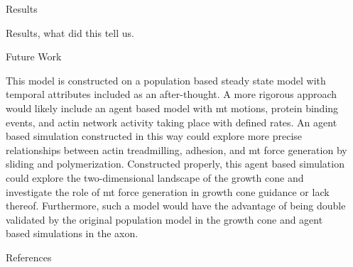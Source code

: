 \documentclass{beamer}
\newlength{\sepwidth}
\newlength{\colwidth}
\newcommand{\separatorcolumn}{\begin{column}{\sepwidth}\end{column}}
\begin{document}
\begin{frame}[t]
\begin{columns}[t]
\begin{column}{\colwidth}
\begin{block}{Results}

Results, what did this tell us.

\end{block}

\begin{block}{Future Work}

This model is constructed on a population based steady state model with temporal attributes included as an after-thought. A more rigorous approach would likely include an agent based model with mt motions, protein binding events, and actin network activity taking place with defined rates. An agent based simulation constructed in this way could explore more precise relationships between actin treadmilling, adhesion, and mt force generation by sliding and polymerization. Constructed properly, this agent based simulation could explore the two-dimensional landscape of the growth cone and investigate the role of mt force generation in growth cone guidance or lack thereof. Furthermore, such a model would have the advantage of being double validated by the original population model in the growth cone and agent based simulations in the axon.

\end{block}

\begin{block}{References}
\begin{multicols}{2}
\fontsize{16pt}{12pt}\selectfont
\nocite{craig2015pb, craig2012bj, devincentiis2020jn, kalil2005con, nedelec1997n13, raffa2023scdb, sanchez-huertas2021fmn}


\end{multicols}
\end{block}

\end{column}
\separatorcolumn%

\end{columns}
\end{frame}
\end{document}
